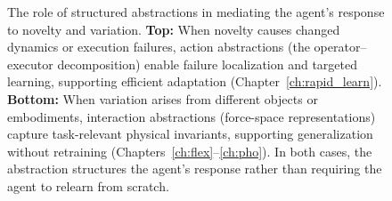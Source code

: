 \begin{figure}[t]
    \caption[Structured abstractions mediating agent responses to novelty and variation]{The role of structured abstractions in mediating the agent's response to novelty and variation. \textbf{Top:} When novelty causes changed dynamics or execution failures, action abstractions (the operator--executor decomposition) enable failure localization and targeted learning, supporting efficient adaptation (Chapter~\ref{ch:rapid_learn}). \textbf{Bottom:} When variation arises from different objects or embodiments, interaction abstractions (force-space representations) capture task-relevant physical invariants, supporting generalization without retraining (Chapters~\ref{ch:flex}--\ref{ch:pho}). In both cases, the abstraction structures the agent's response rather than requiring the agent to relearn from scratch.}
    \label{fig:abstractions_buffer}
\end{figure}
